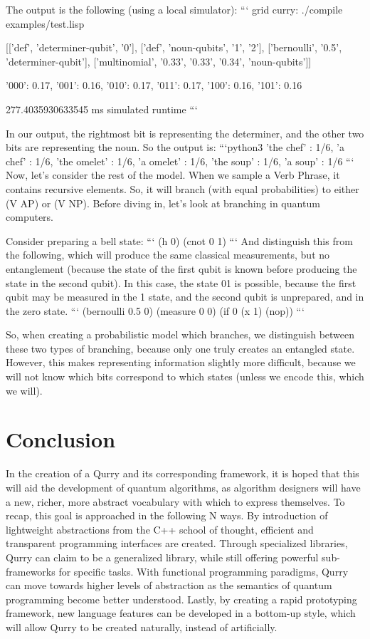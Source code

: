 \documentclass[journal]{IEEEtran}
\begin{document}
 The output is the following (using a local simulator):
 ```
 grid {curry}: ./compile examples/test.lisp
 
 [['def', 'determiner-qubit', '0'],
  ['def', 'noun-qubits', '1', '2'],
  ['bernoulli', '0.5', 'determiner-qubit'],
  ['multinomial', '0.33', '0.33', '0.34', 'noun-qubits']]
 
 {'000': 0.17, '001': 0.16, '010': 0.17, '011': 0.17, '100': 0.16, '101': 0.16}
 
 277.4035930633545 ms simulated runtime
 ```
 
 In our output, the rightmost bit is representing the determiner, and the other two bits are representing the noun.
 So the output is:
 ```python3
 {'the chef' : 1/6, 'a chef' : 1/6, 'the omelet' : 1/6, 'a omelet' : 1/6, 'the soup' : 1/6, 'a soup' : 1/6}
 ```
 Now, let's consider the rest of the model.
 When we sample a Verb Phrase, it contains recursive elements.
 So, it will branch (with equal probabilities) to either (V AP) or (V NP).
 Before diving in, let's look at branching in quantum computers.
 
 Consider preparing a bell state:
 ```
 (h 0)
 (cnot 0 1)
 ```
 And distinguish this from the following, which will produce the same classical measurements, but no entanglement (because the state of the first qubit is known before producing the state in the second qubit). 
 In this case, the state 01 is possible, because the first qubit may be measured in the 1 state, and the second qubit is unprepared, and in the zero state.
 ```
 (bernoulli 0.5 0)
 (measure 0 0)
 (if 0 (x 1) (nop))
 ```
 
 So, when creating a probabilistic model which branches, we distinguish between these two types of branching, because only one truly creates an entangled state.
 However, this makes representing information slightly more difficult, because we will not know which bits correspond to which states (unless we encode this, which we will).

\section{Conclusion}

In the creation of a Qurry and its corresponding framework, it is hoped that this will aid the development of quantum algorithms, as algorithm designers will have a new, richer, more abstract vocabulary with which to express themselves.
To recap, this goal is approached in the following N ways.
By introduction of lightweight abstractions from the C++ school of thought, efficient and transparent programming interfaces are created.
Through specialized libraries, Qurry can claim to be a generalized library, while still offering powerful sub-frameworks for specific tasks.
With functional programming paradigms, Qurry can move towards higher levels of abstraction as the semantics of quantum programming become better understood.
Lastly, by creating a rapid prototyping framework, new language features can be developed in a bottom-up style, which will allow Qurry to be created naturally, instead of artificially.
\end{document}
